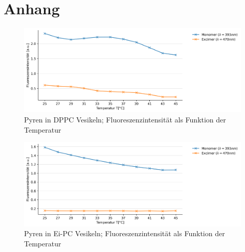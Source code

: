 \section{Anhang}

\begin{figure}[h!]
	\begin{center}
		\begin{minipage}{0,8\textwidth}
			
			\includegraphics[width=\textwidth]{analysis/reports/DPPC_Temp.png}
			\caption{Pyren in DPPC Vesikeln; Fluoreszenzintensität als Funktion der Temperatur} 
			\label{Monomer_Temp} 
		\end{minipage}
	\end{center}
\end{figure}

\begin{figure}[h!]
	\begin{center}
		\begin{minipage}{0,8\textwidth}
			
			\includegraphics[width=\textwidth]{analysis/reports//Ei-PC_Temp.png}
			\caption{Pyren in Ei-PC Vesikeln; Fluoreszenzintensität als Funktion der Temperatur} 
			\label{Excimer_Temp} 
		\end{minipage}
	\end{center}
\end{figure}
